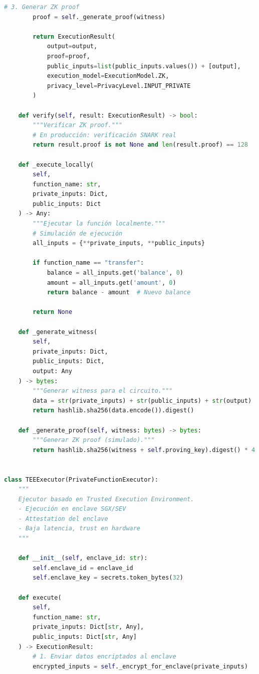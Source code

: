 \documentclass[11pt,a4paper,twoside]{book}
\theoremstyle{definition}
\theoremstyle{remark}
\begin{document}
\begin{lstlisting}[language=Python, caption={Framework para private function calls}]
        # 3. Generar ZK proof
        proof = self._generate_proof(witness)
        
        return ExecutionResult(
            output=output,
            proof=proof,
            public_inputs=list(public_inputs.values()) + [output],
            execution_model=ExecutionModel.ZK,
            privacy_level=PrivacyLevel.INPUT_PRIVATE
        )
    
    def verify(self, result: ExecutionResult) -> bool:
        """Verificar ZK proof."""
        # En producción: verificación SNARK real
        return result.proof is not None and len(result.proof) == 128
    
    def _execute_locally(
        self,
        function_name: str,
        private_inputs: Dict,
        public_inputs: Dict
    ) -> Any:
        """Ejecutar la función localmente."""
        # Simulación de ejecución
        all_inputs = {**private_inputs, **public_inputs}
        
        if function_name == "transfer":
            balance = all_inputs.get('balance', 0)
            amount = all_inputs.get('amount', 0)
            return balance - amount  # Nuevo balance
        
        return None
    
    def _generate_witness(
        self,
        private_inputs: Dict,
        public_inputs: Dict,
        output: Any
    ) -> bytes:
        """Generar witness para el circuito."""
        data = str(private_inputs) + str(public_inputs) + str(output)
        return hashlib.sha256(data.encode()).digest()
    
    def _generate_proof(self, witness: bytes) -> bytes:
        """Generar ZK proof (simulado)."""
        return hashlib.sha256(witness + self.proving_key).digest() * 4


class TEEExecutor(PrivateFunctionExecutor):
    """
    Ejecutor basado en Trusted Execution Environment.
    - Ejecución en enclave SGX/SEV
    - Attestation del enclave
    - Baja latencia, trust en hardware
    """
    
    def __init__(self, enclave_id: str):
        self.enclave_id = enclave_id
        self.enclave_key = secrets.token_bytes(32)
    
    def execute(
        self,
        function_name: str,
        private_inputs: Dict[str, Any],
        public_inputs: Dict[str, Any]
    ) -> ExecutionResult:
        # 1. Enviar datos encriptados al enclave
        encrypted_inputs = self._encrypt_for_enclave(private_inputs)
        

\end{lstlisting}
\end{document}
